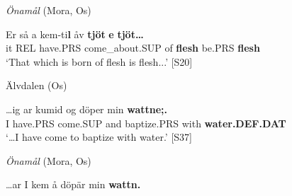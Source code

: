 \textit{Önamål} (Mora, Os)



 \ea\label{}
\gll Er  så  a  kem-ti\textbf{l} åv  \textbf{tjöt}\textbf{  e}\textbf{  tjöt…}\\


it  REL  have.PRS  come\_about.SUP  of  \textbf{flesh} be.PRS  \textbf{flesh}\\

\glt ‘That which is born of flesh is flesh...’\textbf{ }[S20]\textbf{ }

\z

\item 


\item 

Älvdalen (Os)



 \ea\label{}
\gll …ig  ar  kumid  og  döper  min  \textbf{wattne;.}\\


 I  have.PRS  come.SUP  and  baptize.PRS  with  \textbf{water.DEF.DAT}\\

\glt ‘…I have come to baptize with water.’ [S37]

\z

\item 

\textit{Önamål} (Mora, Os)



 \ea\label{}
\gll …ar  I  kem  å  döpär  min  \textbf{wattn.}\\


